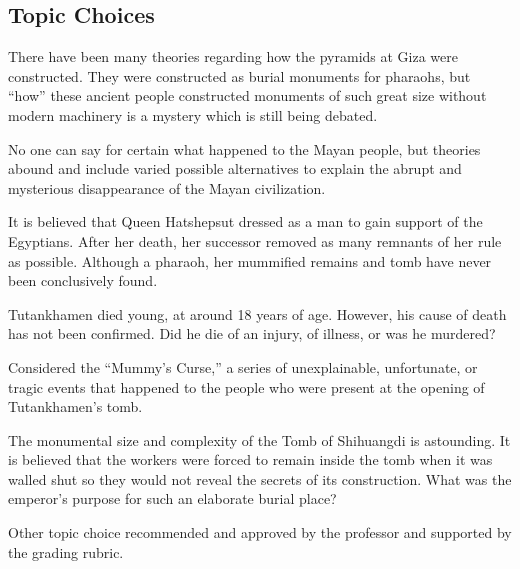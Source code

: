 \subsection*{Topic Choices}
\begin{enumerate*}
	\item There have been many theories regarding how the pyramids at Giza were constructed. They were constructed as burial monuments for pharaohs, but ``how'' these ancient people constructed monuments of such great size without modern machinery is a mystery which is still being debated.

	\item No one can say for certain what happened to the Mayan people, but theories abound and include varied possible alternatives to explain the abrupt and mysterious disappearance of the Mayan civilization.

	\item It is believed that Queen Hatshepsut dressed as a man to gain support of the Egyptians. After her death, her successor removed as many remnants of her rule as possible. Although a pharaoh, her mummified remains and tomb have never been conclusively found.

	\item Tutankhamen died young, at around 18 years of age. However, his cause of death has not been confirmed. Did he die of an injury, of illness, or was he murdered?

	\item Considered the ``Mummy's Curse,'' a series of unexplainable, unfortunate, or tragic events that happened to the people who were present at the opening of Tutankhamen's tomb.

	\item The monumental size and complexity of the Tomb of Shihuangdi is astounding. It is believed that the workers were forced to remain inside the tomb when it was walled shut so they would not reveal the secrets of its construction. What was the emperor's purpose for such an elaborate burial place?

	\item Other topic choice recommended and approved by the professor and supported by the grading rubric.
\end{enumerate*}

